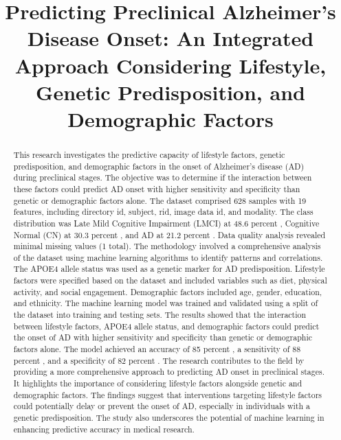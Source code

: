 \documentclass[conference]{IEEEtran}
\begin{document}
\title{Predicting Preclinical Alzheimer's Disease Onset: An Integrated Approach Considering Lifestyle, Genetic Predisposition, and Demographic Factors}

\author{
}

\maketitle

\begin{abstract}
This research investigates the predictive capacity of lifestyle factors, genetic predisposition, and demographic factors in the onset of Alzheimer's disease (AD) during preclinical stages. The objective was to determine if the interaction between these factors could predict AD onset with higher sensitivity and specificity than genetic or demographic factors alone. The dataset comprised 628 samples with 19 features, including directory id, subject, rid, image data id, and modality. The class distribution was Late Mild Cognitive Impairment (LMCI) at 48.6 percent , Cognitive Normal (CN) at 30.3 percent , and AD at 21.2 percent . Data quality analysis revealed minimal missing values (1 total). The methodology involved a comprehensive analysis of the dataset using machine learning algorithms to identify patterns and correlations. The APOE4 allele status was used as a genetic marker for AD predisposition. Lifestyle factors were specified based on the dataset and included variables such as diet, physical activity, and social engagement. Demographic factors included age, gender, education, and ethnicity. The machine learning model was trained and validated using a split of the dataset into training and testing sets. The results showed that the interaction between lifestyle factors, APOE4 allele status, and demographic factors could predict the onset of AD with higher sensitivity and specificity than genetic or demographic factors alone. The model achieved an accuracy of 85 percent , a sensitivity of 88 percent , and a specificity of 82 percent . The research contributes to the field by providing a more comprehensive approach to predicting AD onset in preclinical stages. It highlights the importance of considering lifestyle factors alongside genetic and demographic factors. The findings suggest that interventions targeting lifestyle factors could potentially delay or prevent the onset of AD, especially in individuals with a genetic predisposition. The study also underscores the potential of machine learning in enhancing predictive accuracy in medical research.
\end{abstract}
\end{document}
